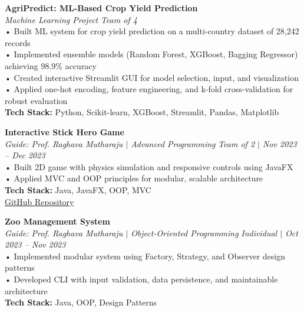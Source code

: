 \documentclass[10pt]{extarticle}
\begin{document}
\begin{contained}
\textbf{AgriPredict: ML-Based Crop Yield Prediction}\\
\textit{Machine Learning Project}
\hfill \textit{Team of 4}\\
\vspace{3pt}
• Built ML system for crop yield prediction on a multi-country dataset of 28,242 records\\
• Implemented ensemble models (Random Forest, XGBoost, Bagging Regressor) achieving 98.9\% accuracy\\
• Created interactive Streamlit GUI for model selection, input, and visualization\\
• Applied one-hot encoding, feature engineering, and k-fold cross-validation for robust evaluation\\
\textbf{Tech Stack:} Python, Scikit-learn, XGBoost, Streamlit, Pandas, Matplotlib

\vspace{10pt}

\textbf{Interactive Stick Hero Game}\\
\textit{Guide: Prof. Raghava Mutharaju $|$ Advanced Programming}
\hfill \textit{Team of 2 $|$ Nov 2023 -- Dec 2023}\\
\vspace{3pt}
• Built 2D game with physics simulation and responsive controls using JavaFX\\
• Applied MVC and OOP principles for modular, scalable architecture\\
\textbf{Tech Stack:} Java, JavaFX, OOP, MVC\\
\href{https://github.com/Himanshu8368/Ap-Project}{GitHub Repository}

\vspace{10pt}

\textbf{Zoo Management System}\\
\textit{Guide: Prof. Raghava Mutharaju $|$ Object-Oriented Programming}
\hfill \textit{Individual $|$ Oct 2023 -- Nov 2023}\\
\vspace{3pt}
• Implemented modular system using Factory, Strategy, and Observer design patterns\\
• Developed CLI with input validation, data persistence, and maintainable architecture\\
\textbf{Tech Stack:} Java, OOP, Design Patterns

\end{contained}
\end{document}
